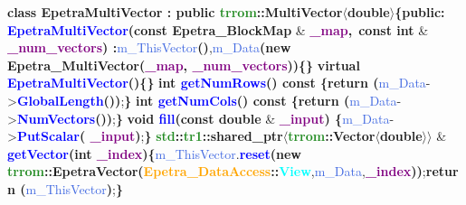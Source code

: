     \newline\textbf{class \textcolor{Melon}{EpetraMultiVector} : public \textcolor{ForestGreen}{trrom}::\textcolor{Melon}{MultiVector}$\mathbf{\langle}$\textcolor{BrickRed}{double}$\mathbf{\rangle}$\{}\newline\textbf{public:}\newline
    \tab\textbf{\textcolor{blue}{EpetraMultiVector}(const \textcolor{Melon}{Epetra\_BlockMap}} \& \textbf{\textcolor{Purple}{ \_map},}\newline\tab\tab\tab\tab\tab\ \textbf{const \textcolor{BrickRed}{int}}  \& \textbf{\textcolor{Purple}{\_num\_vectors}) :}\newline\tab\tab\textcolor{RoyalBlue}{m\_ThisVector}\textbf{()},\newline\tab\tab\textcolor{RoyalBlue}{m\_Data}\textbf{(new \textcolor{Melon}{Epetra\_MultiVector}(\textcolor{Purple}{\_map}, \textcolor{Purple}{\_num\_vectors}))\{\}}\newline
    \tab\textbf{virtual \textcolor{blue}{\detokenize{~}EpetraMultiVector}()\{\}}\newline\newline
    \tab\textbf{\textcolor{BrickRed}{int} \textcolor{blue}{getNumRows}() const \{}\textbf{return (}\textcolor{RoyalBlue}{m\_Data}-\textgreater\textbf{\textcolor{blue}{GlobalLength}())};\textbf{\}}\newline
    \tab\textbf{\textcolor{BrickRed}{int} \textcolor{blue}{getNumCols}() const \{}\textbf{return (}\textcolor{RoyalBlue}{m\_Data}-\textgreater\textbf{\textcolor{blue}{NumVectors}())};\textbf{\}}\newline
    \tab\textbf{\textcolor{BrickRed}{void} \textcolor{blue}{fill}(const \textcolor{BrickRed}{double}} \& \textbf{\textcolor{Purple}{ \_input}) \{}\textcolor{RoyalBlue}{m\_Data}-\textgreater\textbf{\textcolor{blue}{PutScalar}(\textcolor{Purple}{ \_input})};\textbf{\}}\newline
    \tab\textbf{\textcolor{ForestGreen}{std}::\textcolor{ForestGreen}{tr1}::\textcolor{Melon}{shared\_ptr}$\langle$\textcolor{ForestGreen}{trrom}::\textcolor{Melon}{Vector}$\mathbf{\langle}$\textcolor{BrickRed}{double}$\mathbf{\rangle}$$\rangle$} \& \textbf{\textcolor{blue}{getVector}(\textcolor{BrickRed}{int} \textcolor{Purple}{\_index})\{}\newline\tab\tab\textcolor{RoyalBlue}{m\_ThisVector}.\textbf{\textcolor{blue}{reset}(new \textcolor{ForestGreen}{trrom}::\textcolor{Melon}{EpetraVector}(\textcolor{Orange}{Epetra\_DataAccess}::\textcolor{Cyan}{View}},\newline\tab\tab\tab\tab\tab\tab\tab\tab\tab\tab\tab*\textcolor{RoyalBlue}{m\_Data},\newline\tab\tab\tab\tab\tab\tab\tab\tab\tab\tab\tab\textbf{\textcolor{Purple}{\_index}))};\newline\tab\tab\textbf{return (}\textcolor{RoyalBlue}{m\_ThisVector}\textbf{)};\newline\tab\textbf{\}}\newline
